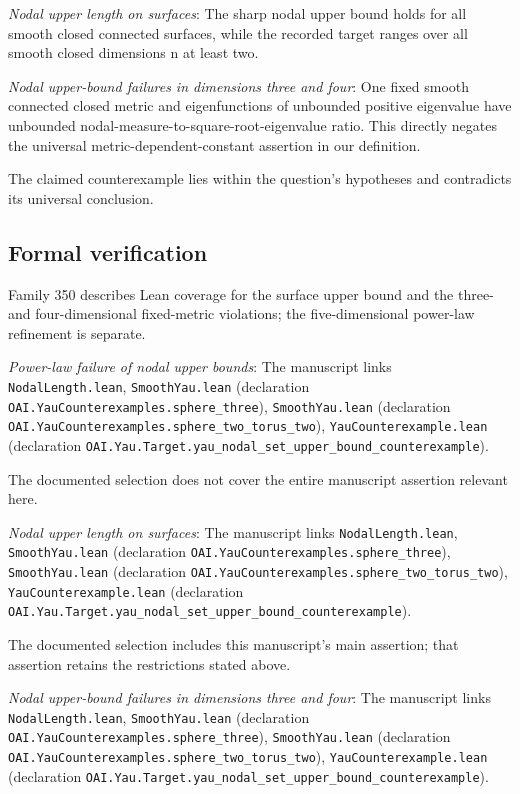 \documentclass[11pt]{article}
\begin{document}
\textit{Nodal upper length on surfaces}: The sharp nodal upper bound holds for all smooth closed connected surfaces, while the recorded target ranges over all smooth closed dimensions n at least two.

\textit{Nodal upper-bound failures in dimensions three and four}: One fixed smooth connected closed metric and eigenfunctions of unbounded positive eigenvalue have unbounded nodal-measure-to-square-root-eigenvalue ratio. This directly negates the universal metric-dependent-constant assertion in our definition.

The claimed counterexample lies within the question’s hypotheses and contradicts its universal conclusion.

\subsection{Formal verification}
Family 350 describes Lean coverage for the surface upper bound and the three- and four-dimensional fixed-metric violations; the five-dimensional power-law refinement is separate.

\textit{Power-law failure of nodal upper bounds}: The manuscript links \texttt{NodalLength.lean}, \texttt{SmoothYau.lean} (declaration \texttt{OAI.YauCounterexamples.sphere\_three}), \texttt{SmoothYau.lean} (declaration \texttt{OAI.YauCounterexamples.sphere\_two\_torus\_two}), \texttt{YauCounterexample.lean} (declaration \texttt{OAI.Yau.Target.yau\_nodal\_set\_upper\_bound\_counterexample}).

The documented selection does not cover the entire manuscript assertion relevant here.

\textit{Nodal upper length on surfaces}: The manuscript links \texttt{NodalLength.lean}, \texttt{SmoothYau.lean} (declaration \texttt{OAI.YauCounterexamples.sphere\_three}), \texttt{SmoothYau.lean} (declaration \texttt{OAI.YauCounterexamples.sphere\_two\_torus\_two}), \texttt{YauCounterexample.lean} (declaration \texttt{OAI.Yau.Target.yau\_nodal\_set\_upper\_bound\_counterexample}).

The documented selection includes this manuscript’s main assertion; that assertion retains the restrictions stated above.

\textit{Nodal upper-bound failures in dimensions three and four}: The manuscript links \texttt{NodalLength.lean}, \texttt{SmoothYau.lean} (declaration \texttt{OAI.YauCounterexamples.sphere\_three}), \texttt{SmoothYau.lean} (declaration \texttt{OAI.YauCounterexamples.sphere\_two\_torus\_two}), \texttt{YauCounterexample.lean} (declaration \texttt{OAI.Yau.Target.yau\_nodal\_set\_upper\_bound\_counterexample}).
\end{document}
